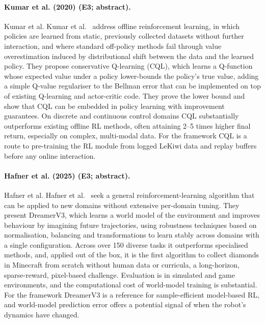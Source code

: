 \documentclass[10pt,a4paper]{article}
\begin{document}
\paragraph{Kumar et al. (2020) (E3; abstract).} Kumar et al. Kumar et al.~\cite{Kumar2020} address offline reinforcement learning, in which policies are learned from static, previously collected datasets without further interaction, and where standard off-policy methods fail through value overestimation induced by distributional shift between the data and the learned policy. They propose conservative Q-learning (CQL), which learns a Q-function whose expected value under a policy lower-bounds the policy's true value, adding a simple Q-value regulariser to the Bellman error that can be implemented on top of existing Q-learning and actor-critic code. They prove the lower bound and show that CQL can be embedded in policy learning with improvement guarantees. On discrete and continuous control domains CQL substantially outperforms existing offline RL methods, often attaining 2--5 times higher final return, especially on complex, multi-modal data. For the framework CQL is a route to pre-training the RL module from logged LeKiwi data and replay buffers before any online interaction.

\paragraph{Hafner et al. (2025) (E3; abstract).} Hafner et al. Hafner et al.~\cite{Hafner2023} seek a general reinforcement-learning algorithm that can be applied to new domains without extensive per-domain tuning. They present DreamerV3, which learns a world model of the environment and improves behaviour by imagining future trajectories, using robustness techniques based on normalisation, balancing and transformations to learn stably across domains with a single configuration. Across over 150 diverse tasks it outperforms specialised methods, and, applied out of the box, it is the first algorithm to collect diamonds in Minecraft from scratch without human data or curricula, a long-horizon, sparse-reward, pixel-based challenge. Evaluation is in simulated and game environments, and the computational cost of world-model training is substantial. For the framework DreamerV3 is a reference for sample-efficient model-based RL, and world-model prediction error offers a potential signal of when the robot's dynamics have changed.
\end{document}
